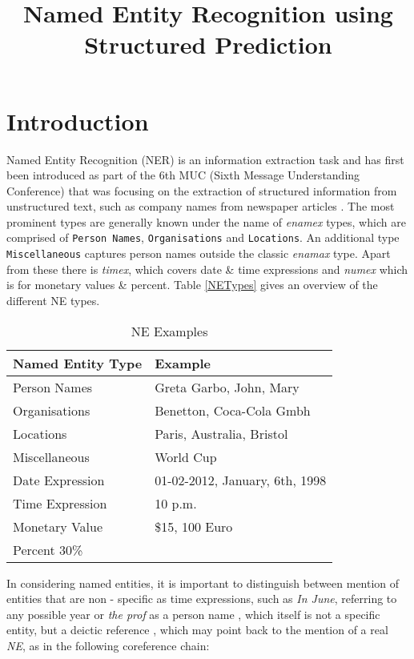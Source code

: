 \documentclass[11pt]{article}
\title{Named Entity Recognition using Structured Prediction}
\begin{document}
\maketitle

\section{Introduction}
Named Entity Recognition (NER) is an information extraction task and has first been introduced as part of the 6th MUC (Sixth Message Understanding Conference)
that was focusing on the extraction of structured information from unstructured text, such as company names from newspaper articles \cite{ner-sekine2007}.
The most prominent types are generally known under the name of \emph{enamex} types, which are comprised of \texttt{Person Names}, \texttt{Organisations} and \texttt{Locations}. 
An additional type \texttt{Miscellaneous} captures person names outside the classic \emph{enamax} type.
Apart from these there is \emph{timex}, which covers date \& time expressions and \emph{numex} which is for monetary values \& percent. 
Table \ref{NETypes} gives an overview of the different NE types.

\begin{table}[h!]
\scriptsize
\begin{tabular}{l|l}
\hline
\bf Named Entity Type & \bf Example \\
\hline
Person Names & Greta Garbo, John, Mary \\
Organisations& Benetton, Coca-Cola Gmbh\\
Locations&  Paris, Australia, Bristol\\
Miscellaneous& World Cup\\
 Date Expression& 01-02-2012, January, 6th, 1998 \\
Time Expression & 10 p.m.\\
Monetary Value &  \$15, 100 Euro   \\
Percent 30\%&   \\
\end{tabular}
\caption{NE Examples}
\label{table:NETypes}
\end{table}


In considering named entities, it is important to distinguish between mention of entities that are non - specific as 
time expressions, such as \emph{In June}, referring to any possible year or \emph{the prof} as a person name , which itself is not a specific entity, but a deictic reference
, which may point back to the mention of a real \emph{NE}, as in the following coreference chain: \\
\end{document}
